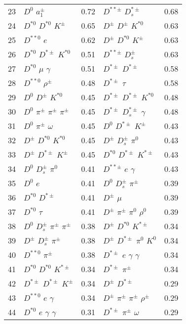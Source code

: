 \documentclass[6pt]{article}
\begin{document}
\begin{tabular}{rlr|lr}
23 & $D^0$ $a_1^{\pm}$ & 0.72 & $D^{**\pm}$ $D_s^{*\pm}$ & 0.68 \\
24 & $D^{*0}$ $D^{*0}$ $K^{\pm}$ & 0.65 & $D^{\pm}$ $D^{\pm}$ $K^{*0}$ & 0.63 \\
25 & $D^{**0}$ $e$ & 0.62 & $D^{\pm}$ $D^{*0}$ $K^{\pm}$ & 0.63 \\
26 & $D^{*0}$ $D^{*\pm}$ $K^{*0}$ & 0.51 & $D^{**\pm}$ $D_s^{\pm}$ & 0.63 \\
27 & $D^{*0}$ $\mu$ $\gamma$ & 0.51 & $D^{*\pm}$ $D^{*\pm}$ & 0.58 \\
28 & $D^{**0}$ $\rho^{\pm}$ & 0.48 & $D^{*\pm}$ $\tau$ & 0.58 \\
29 & $D^0$ $D^{\pm}$ $K^{*0}$ & 0.45 & $D^{*\pm}$ $D^{*\pm}$ $K^{*0}$ & 0.48 \\
30 & $D^0$ $\pi^{\pm}$ $\pi^{\pm}$ $\pi^{\pm}$ & 0.45 & $D^{*\pm}$ $D_s^{*\pm}$ $\gamma$ & 0.48 \\
31 & $D^0$ $\pi^{\pm}$ $\omega$ & 0.45 & $D^0$ $D^{*\pm}$ $K^{\pm}$ & 0.43 \\
32 & $D^{\pm}$ $D^{*0}$ $K^{*0}$ & 0.45 & $D^{\pm}$ $D_s^{\pm}$ $\pi^0$ & 0.43 \\
33 & $D^{\pm}$ $D^{*\pm}$ $K^{\pm}$ & 0.45 & $D^{*0}$ $D^{*\pm}$ $K^{*\pm}$ & 0.43 \\
34 & $D^0$ $D_s^{\pm}$ $\pi^0$ & 0.41 & $D^{**\pm}$ $e$ $\gamma$ & 0.43 \\
35 & $D^0$ $e$ & 0.41 & $D^0$ $D_s^{\pm}$ $\pi^{\pm}$ & 0.39 \\
36 & $D^{*0}$ $D^{*\pm}$ & 0.41 & $D^{\pm}$ $\mu$ & 0.39 \\
37 & $D^{*0}$ $\tau$ & 0.41 & $D^{\pm}$ $\pi^{\pm}$ $\pi^0$ $\rho^0$ & 0.39 \\
38 & $D^0$ $D_s^{\pm}$ $\pi^{\pm}$ $\pi^{\pm}$ & 0.38 & $D^{\pm}$ $D^{*0}$ $K^{*\pm}$ & 0.34 \\
39 & $D^{\pm}$ $D_s^{\pm}$ $\pi^{\pm}$ & 0.38 & $D^{\pm}$ $D^{*\pm}$ $\pi^0$ $K^0$ & 0.34 \\
40 & $D^{**0}$ $\pi^{\pm}$ & 0.38 & $D^{*\pm}$ $e$ $\gamma$ $\gamma$ & 0.34 \\
41 & $D^{*0}$ $D^{*0}$ $K^{*\pm}$ & 0.34 & $D^{*\pm}$ $\pi^{\pm}$ & 0.34 \\
42 & $D^{*\pm}$ $D^{*\pm}$ $K^{\pm}$ & 0.34 & $D^{\pm}$ $D^{*\pm}$ & 0.29 \\
43 & $D^{**0}$ $e$ $\gamma$ & 0.34 & $D^{\pm}$ $\pi^{\pm}$ $\pi^{\pm}$ $\rho^{\pm}$ & 0.29 \\
44 & $D^{*0}$ $e$ $\gamma$ $\gamma$ & 0.31 & $D^{*\pm}$ $\pi^{\pm}$ $\omega$ & 0.29 \\

\end{tabular}
\end{document}
